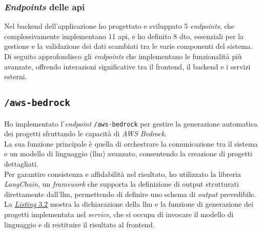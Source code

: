 \subsubsection{\textit{Endpoints} delle \gls{api}}

Nel \gls{backend} dell'applicazione ho progettato e sviluppato 5 \textit{endpoints}, che complessivamente implementano 11 \gls{api}, e ho definito 8 \gls{dto}, essenziali per la gestione e la validazione dei dati scambiati tra le varie componenti del sistema.\\

\noindent Di seguito approfondisco gli \textit{endpoints} che implementano le funzionalità più avanzate, offrendo interazioni significative tra il \gls{frontend}, il \gls{backend} e i servizi esterni.

\subsection*{\texttt{/aws-bedrock}}
Ho implementato l’\textit{endpoint} \texttt{/aws-bedrock} per gestire la generazione automatica dei progetti sfruttando le capacità di \textit{AWS Bedrock}.\\
La sua funzione principale è quella di orchestrare la comunicazione tra il sistema e un modello di linguaggio (\gls{llm}) avanzato, consentendo la creazione di progetti dettagliati.\\

\noindent Per garantire consistenza e affidabilità nel risultato, ho utilizzato la libreria \textit{LangChain}, un \textit{framework} che supporta la definizione di output strutturati direttamente dall’\gls{llm},
permettendo di definire uno schema di \textit{output} prevedibile.\\

\pagebreak
\noindent La {\hyperref[lst:funzione-generazione-progetto]{\textit{Listing} 3.2}} mostra la dichiarazione della \gls{llm} e la funzione di generazione dei progetti implementata nel \textit{service}, che si occupa di invocare il modello di linguaggio e di restituire il risultato al \gls{frontend}.

